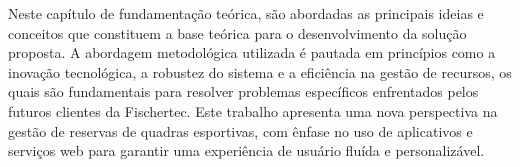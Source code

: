 


Neste capítulo de fundamentação teórica, são abordadas as principais ideias e conceitos que constituem a base teórica para o desenvolvimento da solução proposta. A abordagem metodológica utilizada é pautada em princípios como a inovação tecnológica, a robustez do sistema e a eficiência na gestão de recursos, os quais são fundamentais para resolver problemas específicos enfrentados pelos futuros clientes da Fischertec. Este trabalho apresenta uma nova perspectiva na gestão de reservas de quadras esportivas, com ênfase no uso de aplicativos e serviços web para garantir uma experiência de usuário fluída e personalizável.

